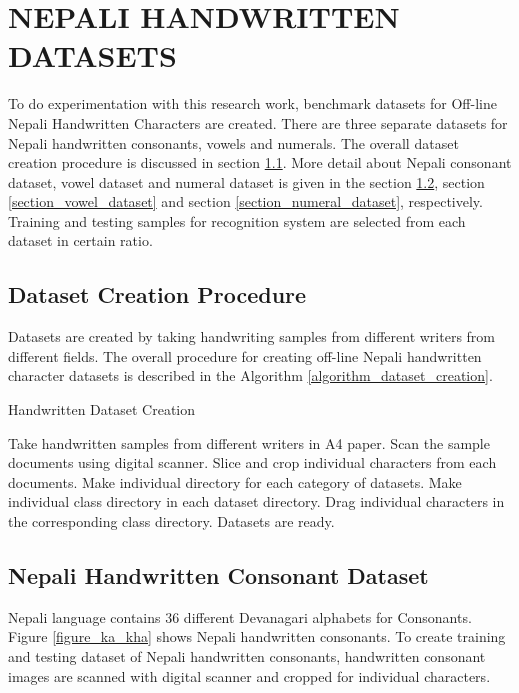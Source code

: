 \newpage
\chapter{NEPALI HANDWRITTEN DATASETS}\label{chapter_nepali_handwritten_database}

To do experimentation with this research work, benchmark datasets for Off-line Nepali Handwritten Characters are created. There are three separate datasets for Nepali handwritten consonants, vowels and numerals. The overall dataset creation procedure is discussed in section \ref{section_dataset_creation_procedure}. More detail about Nepali consonant dataset, vowel dataset and numeral dataset is given in the section \ref{section_consonant_dataset}, section \ref{section_vowel_dataset} and section \ref{section_numeral_dataset}, respectively. Training and testing samples for recognition system are selected from each dataset in certain ratio.

\section{Dataset Creation Procedure}\label{section_dataset_creation_procedure}
Datasets are created by taking handwriting samples from different writers from different fields. The overall procedure for creating off-line Nepali handwritten character datasets is described in the Algorithm \ref{algorithm_dataset_creation}.

\begin{algorithm}
\caption{Handwritten Dataset Creation}
\label{algorithm_dataset_creation}
\begin{algorithmic}[1]
\STATE  Take handwritten samples from different writers in A4 paper.
\STATE  Scan the sample documents using digital scanner.
\STATE  Slice and crop individual characters from each documents.
\STATE  Make individual directory for each category of datasets.
\STATE	Make individual class directory in each dataset directory.
\STATE  Drag individual characters in the corresponding class directory.
\STATE  Datasets are ready.
\end{algorithmic}
\end{algorithm}

\pagebreak
\section{Nepali Handwritten Consonant Dataset}
\label{section_consonant_dataset}

Nepali language contains $36$ different Devanagari alphabets for Consonants. Figure \ref{figure_ka_kha} shows Nepali handwritten consonants. To create training and testing dataset of Nepali handwritten consonants, handwritten consonant images are scanned with digital scanner and cropped for individual characters.

